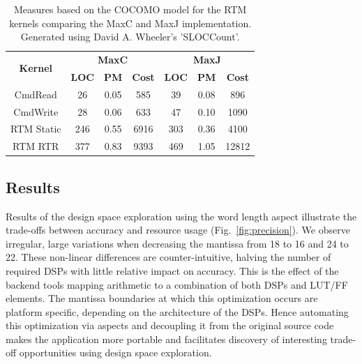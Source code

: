 \begin{table}[!h]
  \renewcommand{\arraystretch}{1.3}
  \centering
  \caption{Measures based on the COCOMO model for the RTM kernels comparing the MaxC and MaxJ
    implementation. Generated using David A. Wheeler's 'SLOCCount'.}
  \label{table:loc}
  \begin{tabular}{c|ccc|ccc}
    \hline
    \multirow{2}{*}{\bf{Kernel}} & \multicolumn{3}{c|}{\bf{MaxC}} & \multicolumn{3}{c}{\bf{MaxJ}}                       \\
    \                            & \bf{LOC}                       & \bf{PM} & \bf{Cost} & \bf{LOC} & \bf{PM} & \bf{Cost} \\
    \hline \hline
    CmdRead                      & 26                             & 0.05    & 585       & 39       & 0.08    & 896       \\
    CmdWrite                     & 28                             & 0.06    & 633       & 47       & 0.10    & 1090      \\
    RTM Static                   & 246                            & 0.55    & 6916      & 303      & 0.36    & 4100      \\
    RTM RTR                      & 377                            & 0.83    & 9393      & 469      & 1.05    & 12812     \\
  \end{tabular}
\end{table}


\subsection{Results}

Results of the design space exploration using the word length aspect
illustrate the trade-offs between accuracy and resource usage (Fig.~\ref{fig:precision}). We observe irregular, large variations when
decreasing the mantissa from 18 to 16 and 24 to 22. These non-linear
differences are counter-intuitive, halving the number of required DSPs
with little relative impact on accuracy. This is the effect of the
backend tools mapping arithmetic to a combination of both DSPs and
LUT/FF elements. The mantissa boundaries at which this optimization
occurs are platform specific, depending on the architecture of the
DSPs. Hence automating this optimization via aspects and decoupling it
from the original source code makes the application more portable and
facilitates discovery of interesting trade-off opportunities using
design space exploration.

